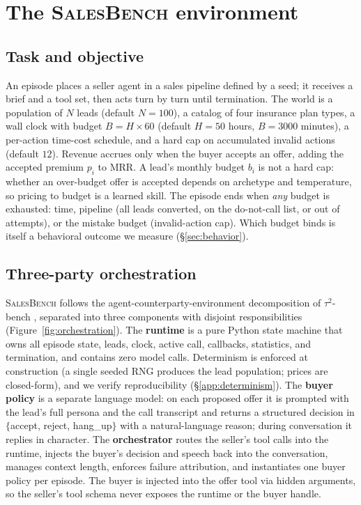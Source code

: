 \documentclass{article} %
\newcommand{\salesbench}{\textsc{SalesBench}}
\begin{document}
\section{The \salesbench{} environment}
\label{sec:env}

\subsection{Task and objective}
An episode places a seller agent in a sales pipeline defined by a seed; it receives a brief and a tool set, then acts
turn by turn until termination. The world is a population of $N$ leads (default $N{=}100$), a catalog of four
insurance plan types, a wall clock with budget $B = H\times 60$ (default $H{=}50$ hours, $B{=}3000$ minutes), a
per-action time-cost schedule, and a hard cap on accumulated invalid actions (default $12$). Revenue accrues only
when the buyer accepts an offer, adding the accepted premium $p_i$ to MRR. A lead's monthly budget $b_i$ is not a
hard cap: whether an over-budget offer is accepted depends on archetype and temperature, so pricing to budget is
a learned skill. The episode ends when \emph{any} budget is exhausted: time, pipeline (all leads converted, on
the do-not-call list, or out of attempts), or the mistake budget (invalid-action cap). Which budget
binds is itself a behavioral outcome we measure (\S\ref{sec:behavior}).

\subsection{Three-party orchestration}
\salesbench{} follows the agent-counterparty-environment decomposition of $\tau^2$-bench
\citep{barres2025tau2bench}, separated into three components with disjoint responsibilities
(Figure~\ref{fig:orchestration}). The \textbf{runtime} is a pure Python state machine that owns all episode
state, leads, clock, active call, callbacks, statistics, and termination, and contains zero model calls.
Determinism is enforced at construction (a single seeded RNG produces the lead population; prices are
closed-form), and we verify reproducibility (\S\ref{app:determinism}). The \textbf{buyer policy} is a separate
language model: on each proposed offer it is prompted with
the lead's full persona and the call transcript and returns a structured decision in
$\{$accept, reject, hang\_up$\}$ with a natural-language reason; during conversation it replies in character.
The \textbf{orchestrator} routes the seller's tool calls into the runtime, injects the buyer's decision and
speech back into the conversation, manages context length, enforces failure attribution, and instantiates one
buyer policy per episode. The buyer is injected into the offer tool via hidden arguments, so the seller's tool schema never
exposes the runtime or the buyer handle.
\end{document}
